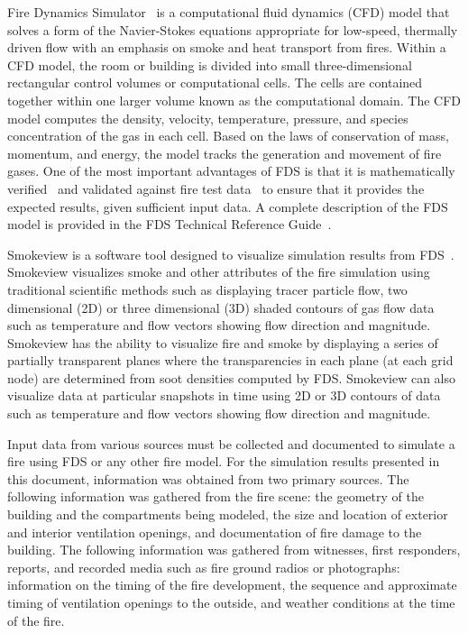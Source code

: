 \documentclass[12pt,oneside]{book}
\begin{document}
Fire Dynamics Simulator~\cite{FDS_Users_Guide} is a computational fluid dynamics (CFD) model that solves a form of the Navier-Stokes equations appropriate for low-speed, thermally driven flow with an emphasis on smoke and heat transport from fires. Within a CFD model, the room or building is divided into small three-dimensional rectangular control volumes or computational cells. The cells are contained together within one larger volume known as the computational domain. The CFD model computes the density, velocity, temperature, pressure, and species concentration of the gas in each cell. Based on the laws of conservation of mass, momentum, and energy, the model tracks the generation and movement of fire gases. One of the most important advantages of FDS is that it is mathematically verified~\cite{FDS_Verification_Guide} and validated against fire test data~\cite{FDS_Validation_Guide} to ensure that it provides the expected results, given sufficient input data. A complete description of the FDS model is provided in the FDS Technical Reference Guide~\cite{FDS_Math_Guide}.

Smokeview is a software tool designed to visualize simulation results from FDS~\cite{Smokeview_Users_Guide}. Smokeview visualizes smoke and other attributes of the fire simulation using traditional scientific methods such as displaying tracer particle flow, two dimensional (2D) or three dimensional (3D) shaded contours of gas flow data such as temperature and flow vectors showing flow direction and magnitude. Smokeview has the ability to visualize fire and smoke by displaying a series of partially transparent planes where the transparencies in each plane (at each grid node) are determined from soot densities computed by FDS. Smokeview can also visualize data at particular snapshots in time using 2D or 3D contours of data such as temperature and flow vectors showing flow direction and magnitude.

Input data from various sources must be collected and documented to simulate a fire using FDS or any other fire model. For the simulation results presented in this document, information was obtained from two primary sources. The following information was gathered from the fire scene: the geometry of the building and the compartments being modeled, the size and location of exterior and interior ventilation openings, and documentation of fire damage to the building. The following information was gathered from witnesses, first responders, reports, and recorded media such as fire ground radios or photographs: information on the timing of the fire development, the sequence and approximate timing of ventilation openings to the outside, and weather conditions at the time of the fire. 
\end{document}
